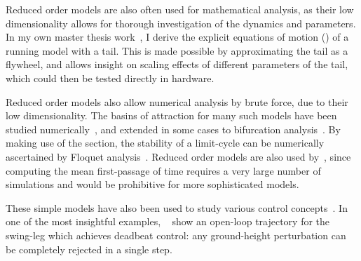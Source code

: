Reduced order models are also often used for mathematical analysis, as their low dimensionality allows for thorough investigation of the dynamics and parameters.
In my own master thesis work~\cite{heim2016designing}, I derive the explicit equations of motion (\eom) of a running model with a tail. This is made possible by approximating the tail as a flywheel, and allows insight on scaling effects of different parameters of the tail, which could then be tested directly in hardware. \par
Reduced order models also allow numerical analysis by brute force, due to their low dimensionality. The basins of attraction for many such models have been studied numerically~\cite{schwab2001basin,obayashi2016formation,cnops2015basin,rummel2008stable}, and extended in some cases to bifurcation analysis~\cite{aoi2006bifurcation,merker2015stable,gan2018all}. By making use of the \poincare section, the stability of a limit-cycle can be numerically ascertained by Floquet analysis~\cite{remy2011matlab}.
Reduced order models are also used by~\textcite{byl2009metastable}, since computing the mean first-passage of time requires a very large number of simulations and would be prohibitive for more sophisticated models. \par
These simple models have also been used to study various control concepts~\cite{piovan2013two,cnops2015basin,piovan2015reachability}. In one of the most insightful examples, ~\textcite{wu20133} show an open-loop trajectory for the swing-leg which achieves deadbeat control: any ground-height perturbation can be completely rejected in a single step.
